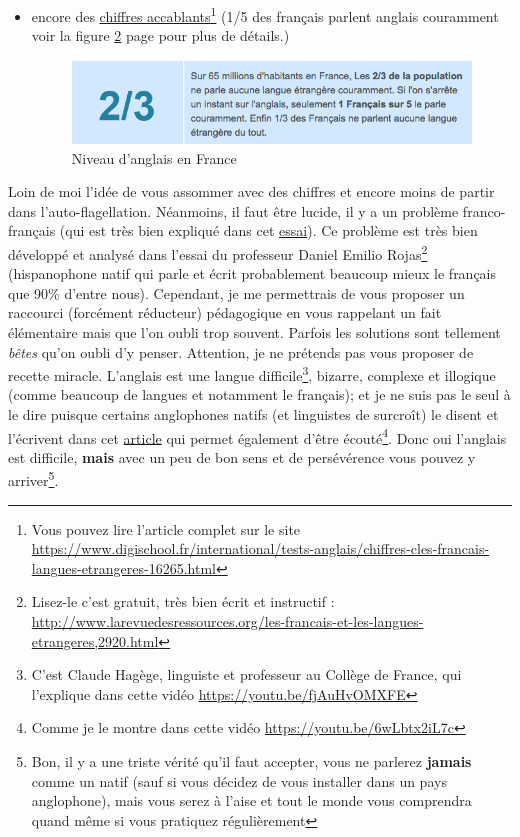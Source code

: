 \documentclass[12pt,a4paper]{book}
\begin{document}
\begin{itemize}
\begin{figure}[h]
    \label{fig:2}
  \end{figure}
\item encore des
  \href{https://www.digischool.fr/international/tests-anglais/chiffres-cles-francais-langues-etrangeres-16265.html}{chiffres
    accablants}\footnote{Vous pouvez lire l'article complet sur le
    site
    \url{https://www.digischool.fr/international/tests-anglais/chiffres-cles-francais-langues-etrangeres-16265.html}}
    (1/5 des français parlent anglais couramment voir la figure
    \ref{fig:3} page \pageref{fig:3} pour plus de détails.)
  \begin{figure}[h]
    \centering
    \caption[L'anglais en France]{Niveau d'anglais en France}\vspace{.1cm}
    \includegraphics[scale=.725]{french-english-level-in-france}
    
    \label{fig:3}
  \end{figure}
\end{itemize}
Loin de moi l'idée de vous assommer avec des chiffres et encore moins
de partir dans l'auto-flagellation. Néanmoins, il faut être lucide, il
y a un problème franco-français (qui est très bien expliqué dans cet
\href{http://www.larevuedesressources.org/les-francais-et-les-langues-etrangeres,2920.html}{essai}). 
Ce problème est très bien développé et analysé dans l'essai du
professeur Daniel Emilio Rojas\footnote{Lisez-le c'est gratuit, très
  bien écrit et instructif : \url{http://www.larevuedesressources.org/les-francais-et-les-langues-etrangeres,2920.html}} (hispanophone natif qui parle et écrit
probablement beaucoup mieux le français que 90\% d'entre
nous). Cependant, je me permettrais de vous proposer un raccourci
(forcément réducteur) pédagogique en vous rappelant un fait
élémentaire mais que l'on oubli trop souvent. Parfois les solutions
sont tellement \emph{bêtes} qu'on oubli d'y penser. Attention, je ne
prétends pas vous proposer de recette miracle. L'anglais est une
langue difficile\footnote{C'est Claude Hagège, linguiste et professeur
  au Collège de France, qui l'explique dans cette vidéo
  \url{https://youtu.be/fjAuHvOMXFE} }, bizarre, complexe et illogique
(comme beaucoup de langues et notamment le français); et je ne suis
pas le seul à le dire puisque certains anglophones natifs (et
linguistes de surcroît) le disent et l'écrivent dans cet \href{https://aeon.co/essays/why-is-english-so-weirdly-different-from-other-languages}{article} qui permet également d'être
écouté\footnote{Comme je le montre dans cette vidéo
  \url{https://youtu.be/6wLbtx2iL7c}}. Donc oui l'anglais est
difficile, \textbf{mais} avec un peu de bon sens et de persévérence
vous pouvez y arriver\footnote{Bon, il y a une triste vérité qu'il
  faut accepter, vous ne parlerez \textbf{jamais} comme un natif (sauf
  si vous décidez de vous installer dans un pays anglophone), mais
  vous serez à l'aise et tout le monde vous comprendra quand même si
  vous pratiquez régulièrement}. 
\end{document}
